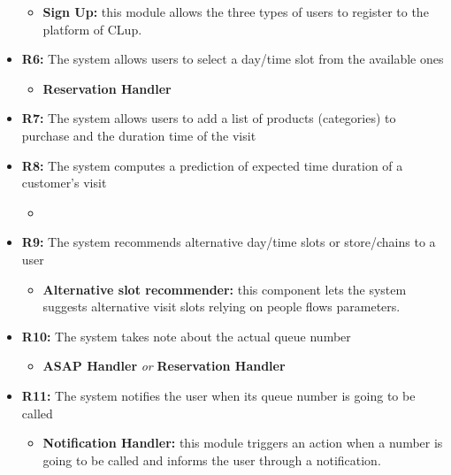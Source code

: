 \documentclass[table, 12pt]{article}
\begin{document}
\begin{itemize}
          \begin{itemize}
              \item \textbf{Sign Up:} this module allows the three types of users to register to the platform of CLup.
          \end{itemize}
    \item \textbf{R6:} The system allows users to select a day/time slot from the available ones
          \begin{itemize}
              \item \textbf{Reservation Handler}
          \end{itemize}
    \item \textbf{R7:} The system allows users to add a list of products (categories) to purchase and the duration time of the visit
    \item \textbf{R8:} The system computes a prediction of expected time duration of a customer's visit
          \begin{itemize}
              \item \textbf{}
          \end{itemize}
    \item \textbf{R9:} The system recommends alternative day/time slots or store/chains to a user
          \begin{itemize}
              \item \textbf{Alternative slot recommender:} this component lets the system suggests alternative visit slots relying on people flows parameters.
          \end{itemize}
    \item \textbf{R10:} The system takes note about the actual queue number
          \begin{itemize}
              \item \textbf{ASAP Handler} \textit{or} \textbf{Reservation Handler}
          \end{itemize}
    \item \textbf{R11:} The system notifies the user when its queue number is going to be called
          \begin{itemize}
              \item \textbf{Notification Handler:} this module triggers an action when a number is going to be called and informs the user through a notification.
          \end{itemize}
\end{itemize}
\end{document}
